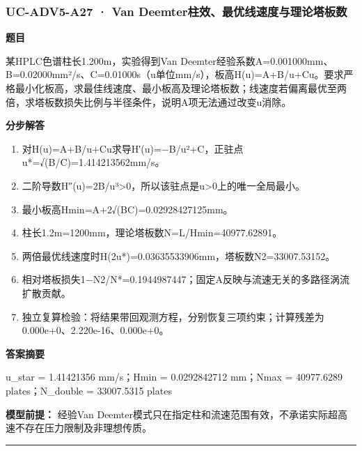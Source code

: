 \documentclass[UTF8,11pt,a4paper]{ctexart}
\begin{document}
\subsubsection*{UC-ADV5-A27 · Van Deemter柱效、最优线速度与理论塔板数}
\noindent\textbf{题目}\par
某HPLC色谱柱长1.200m，实验得到Van Deemter经验系数A=0.001000mm、B=0.02000mm²/s、C=0.01000s（u单位mm/s），板高H(u)=A+B/u+Cu。要求严格最小化板高，求最佳线速度、最小板高及理论塔板数；线速度若偏离最优至两倍，求塔板数损失比例与半径条件，说明A项无法通过改变u消除。\par
\medskip\noindent\textbf{分步解答}
\begin{enumerate}
\item 对H(u)=A+B/u+Cu求导H′(u)=−B/u²+C，正驻点u*=√(B/C)=1.414213562mm/s。
\item 二阶导数H″(u)=2B/u³>0，所以该驻点是u>0上的唯一全局最小。
\item 最小板高Hmin=A+2√(BC)=0.02928427125mm。
\item 柱长1.2m=1200mm，理论塔板数N=L/Hmin=40977.62891。
\item 两倍最优线速度时H(2u*)=0.03635533906mm，塔板数N2=33007.53152。
\item 相对塔板损失1−N2/N*=0.1944987447；固定A反映与流速无关的多路径涡流扩散贡献。
\item 独立复算检验：将结果带回观测方程，分别恢复三项约束；计算残差为 0.000e+0、2.220e-16、0.000e+0。
\end{enumerate}
\noindent\textbf{答案摘要}\par
u\_star = 1.41421356 mm/s；Hmin = 0.0292842712 mm；Nmax = 40977.6289 plates；N\_double = 33007.5315 plates\par
\noindent\textbf{模型前提：}
经验Van Deemter模式只在指定柱和流速范围有效，不承诺实际超高速不存在压力限制及非理想传质。\par
\medskip\hrule\medskip
{}
\end{document}
